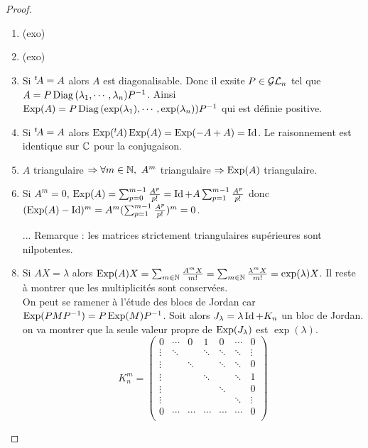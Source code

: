 \begin{proof}\

 \begin{enumerate}
  \item (exo)
  \item (exo)
  \item Si ${}^t\! A = A$ alors $A$ est diagonalisable. Donc il exsite $P\in\mathcal{GL}_n$
tel que $A = P\operatorname{Diag\,}(\lambda_1, \cdots, \lambda_n) P^{-1}$. Ainsi $\operatorname{Exp}(A) =
P\operatorname{Diag\,}(\exp(\lambda_1), \cdots, \exp(\lambda_n))P^{-1}$ qui est définie
positive.
\item Si ${}^t\! A = A$ alors $\operatorname{Exp}({}^t\! A)\operatorname{Exp}(A) = \operatorname{Exp}(-A +A) = \operatorname{Id}$. Le
raisonnement est identique sur $\mathbb{C}$ pour la conjugaison.
 \item $A$ triangulaire $\Rightarrow \forall m\in\N,\ A^m$ triangulaire
$\Rightarrow \operatorname{Exp}(A)$ triangulaire.
 \item Si $A^m = 0$, $\operatorname{Exp}(A) = \sum_{p=0}^{m-1}\frac{A^p}{p!} = \operatorname{Id} +
A\sum_{p=1}^{m-1}\frac{A^p}{p!}$ donc $(\operatorname{Exp}(A)-\operatorname{Id})^m =
A^m(\sum_{p=1}^{m-1}\frac{A^p}{p!})^m = 0$.
 \item[...] Remarque : les matrices strictement triangulaires supérieures sont
nilpotentes.
 \item Si $AX = \lambda $ alors $\operatorname{Exp}(A)X = \sum_{m\in\mathbb{N}}\frac{A^mX}{m!}
 = \sum_{m\in\mathbb{N}}\frac{\lambda^m X}{m!} = \exp(\lambda) X$. Il reste à montrer
que les multiplicités sont conservées.\\
On peut se ramener à l'étude des blocs de Jordan car $\operatorname{Exp}(PMP^{-1}) =
P\operatorname{Exp}(M)P^{-1}$. Soit alors $J_\lambda = \lambda \operatorname{Id} + K_n$ un bloc de Jordan.
on va montrer que la seule valeur propre de $\operatorname{Exp}(J_\lambda)$ est
$\exp(\lambda)$.
\begin{displaymath}
K_n^m = \begin{pmatrix}
 0      & \cdots  & 0      & 1      & 0      & \cdots &  0       \\
 \vdots & \ddots  &        & \ddots & \ddots & \ddots &  \vdots  \\
 \vdots &         & \ddots &        & \ddots & \ddots &  0       \\
 \vdots &         &        & \ddots &        & \ddots &  1       \\
 \vdots &         &        &        & \ddots &        &  0       \\
 \vdots &         &        &        &        & \ddots &  \vdots  \\
 0      & \cdots  & \cdots & \cdots & \cdots & \cdots &  0       \\
 \end{pmatrix}

\end{displaymath}
\end{enumerate}
\end{proof}
